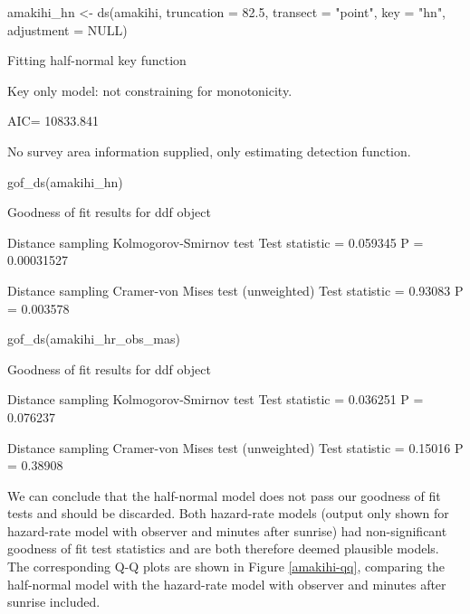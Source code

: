 \documentclass[article,shortnames]{jss}
\begin{document}
\begin{CodeChunk}
\begin{CodeInput}
amakihi_hn <- ds(amakihi, truncation = 82.5, transect = "point",
                 key = "hn", adjustment = NULL)
\end{CodeInput}
\begin{CodeOutput}
Fitting half-normal key function
\end{CodeOutput}
\begin{CodeOutput}
Key only model: not constraining for monotonicity.
\end{CodeOutput}
\begin{CodeOutput}
AIC= 10833.841
\end{CodeOutput}
\begin{CodeOutput}
No survey area information supplied, only estimating detection function.
\end{CodeOutput}
\begin{CodeInput}
gof_ds(amakihi_hn)
\end{CodeInput}
\begin{CodeOutput}

Goodness of fit results for ddf object

Distance sampling Kolmogorov-Smirnov test
Test statistic =  0.059345  P =  0.00031527 

Distance sampling Cramer-von Mises test (unweighted)
Test statistic =  0.93083  P =  0.003578 
\end{CodeOutput}
\begin{CodeInput}
gof_ds(amakihi_hr_obs_mas)
\end{CodeInput}
\begin{CodeOutput}

Goodness of fit results for ddf object

Distance sampling Kolmogorov-Smirnov test
Test statistic =  0.036251  P =  0.076237 

Distance sampling Cramer-von Mises test (unweighted)
Test statistic =  0.15016  P =  0.38908 
\end{CodeOutput}
\end{CodeChunk}

We can conclude that the half-normal model does not pass our goodness of
fit tests and should be discarded. Both hazard-rate models (output only
shown for hazard-rate model with observer and minutes after sunrise) had
non-significant goodness of fit test statistics and are both therefore
deemed plausible models. The corresponding Q-Q plots are shown in Figure
\ref{amakihi-qq}, comparing the half-normal model with the hazard-rate
model with observer and minutes after sunrise included.
\end{document}
